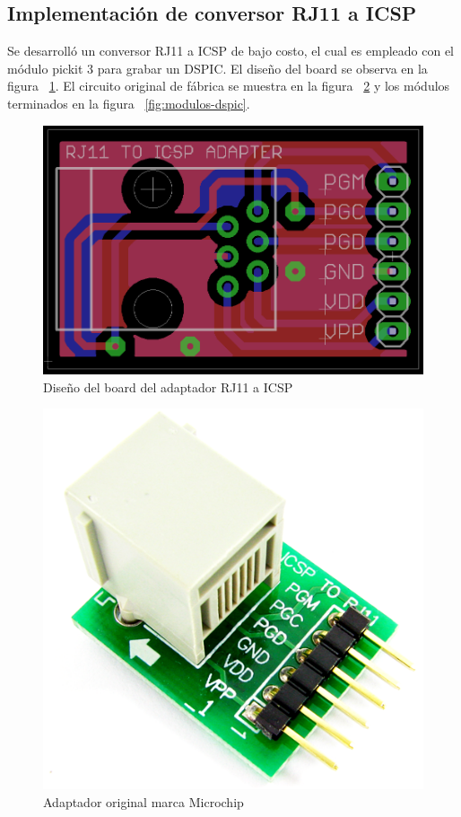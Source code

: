 \clearpage

\subsection{Implementación de conversor RJ11 a ICSP}

Se desarrolló un conversor RJ11 a ICSP de bajo costo, el cual es empleado con el módulo pickit 3 para grabar un DSPIC. El diseño del board se observa en la figura ~\ref{fig:board-dspic}. El circuito original de fábrica se muestra en la figura ~\ref{fig:original-dspic} y los módulos terminados en la figura ~\ref{fig:modulos-dspic}.

\begin{figure}[h!]
  \centering
  \includegraphics[scale=0.36]{images/activities/adaptador_rj11_icsp/board-rj11-icsp.png}
  \caption{Diseño del board del adaptador RJ11 a ICSP}
  \label{fig:board-dspic}
\end{figure}

\begin{figure}[h!]
  \centering
  \includegraphics[scale=0.36]{images/activities/adaptador_rj11_icsp/adapter-dspic.png}
  \caption{Adaptador original marca Microchip}
  \label{fig:original-dspic}
\end{figure}

